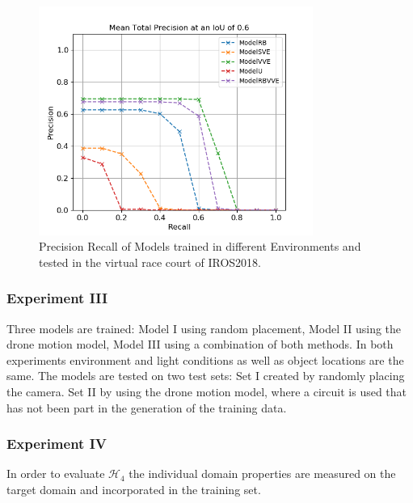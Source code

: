 \begin{figure}
	\centering
	\includegraphics[width=0.8\textwidth]{fig/datagen_II_pr}
	\caption{Precision Recall of Models trained in different Environments and tested in the virtual race court of IROS2018. }
\end{figure}

\subsubsection{Experiment III}

Three models are trained: Model I using random placement, Model II using the drone motion model, Model III using a combination of both methods. In both experiments environment and light conditions as well as object locations are the same. The models are tested on two test sets: Set I created by randomly placing the camera. Set II by using the drone motion model, where a circuit is used that has not been part in the generation of the training data.


\subsubsection{Experiment IV}

In order to evaluate $\mathcal{H}_4$ the individual domain properties are measured on the target domain and incorporated in the training set.


